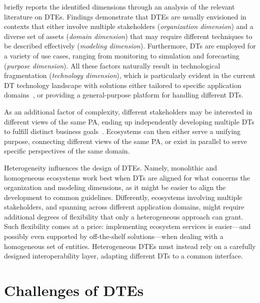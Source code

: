  briefly reports the identified dimensions through an analysis of the relevant literature on \acp{DTE}.
%
Findings demonstrate that \acp{DTE} are usually envisioned in contexts that either involve multiple stakeholders (\emph{organization dimension}) and a diverse set of assets (\emph{domain dimension}) that may require different techniques to be described effectively (\emph{modeling dimension}).
Furthermore, \acp{DT} are employed for a variety of use cases, ranging from monitoring to simulation and forecasting (\emph{purpose dimension}).
%
All these factors naturally result in technological fragmentation (\emph{technology dimension}), which is particularly evident in the current \ac{DT} technology landscape
with solutions either tailored to specific application domains~\cite{Damjanovic-Behrendt_Behrendt_2019}, or providing a general-purpose platform for handling different \acp{DT}.

As an additional factor of complexity, different stakeholders may be interested in different views of the same \ac{PA}, ending up independently developing multiple \acp{DT} to fulfill distinct business goals~\cite{dt-IoT-context-Minerva-2020}.
%
Ecosystems can then either serve a unifying purpose, connecting different views of the same \ac{PA}, or exist in parallel to serve specific perspectives of the same domain.

Heterogeneity influences the design of \acp{DTE}.
%
Namely, monolithic and homogeneous ecosystems work best when \acp{DT} are aligned for what concerns the organization and modeling dimensions, as it might be easier to align the development to common guidelines.
%
Differently, ecosystems involving multiple stakeholders, and spanning across different application domains, might require additional degrees of flexibility that only a heterogeneous approach can grant.
%
Such flexibility comes at a price: implementing ecosystem services is easier---and possibly even supported by off-the-shelf solutions---when dealing with a homogeneous set of entities. 
%
Heterogeneous \acp{DTE} must instead rely on a carefully designed interoperability layer, adapting different \acp{DT} to a common interface.


\section{Challenges of \aclp{DTE}}
\label{sec:dte:dte:challenges}

